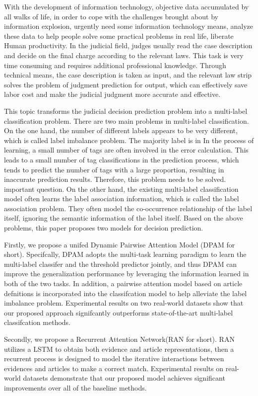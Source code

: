 \begin{eabstract}
With the development of information technology, objective data accumulated by all walks of life, in order to cope with the challenges brought about by information explosion, urgently need some information technology means, analyze these data to help people solve some practical problems in real life, liberate Human productivity. In the judicial field, judges usually read the case description and decide on the final charge according to the relevant laws. This task is very time consuming and requires additional professional knowledge. Through technical means, the case description is taken as input, and the relevant law strip solves the problem of judgment prediction for output, which can effectively save labor cost and make the judicial judgment more accurate and effective.

This topic transforms the judicial decision prediction problem into a multi-label classification problem. There are two main problems in multi-label classification. On the one hand, the number of different labels appears to be very different, which is called label imbalance problem. The majority label is in In the process of learning, a small number of tags are often involved in the error calculation. This leads to a small number of tag classifications in the prediction process, which tends to predict the number of tags with a large proportion, resulting in inaccurate prediction results. Therefore, this problem needs to be solved. important question. On the other hand, the existing multi-label classification model often learns the label association information, which is called the label association problem. They often model the co-occurrence relationship of the label itself, ignoring the semantic information of the label itself. Based on the above problems, this paper proposes two models for decision prediction.

Firstly, we propose a unifed Dynamic Pairwise Attention Model (DPAM for short). Specifcally, DPAM adopts the multi-task learning paradigm to learn the multi-label classifer and the threshold predictor jointly, and thus DPAM can improve the generalization performance by leveraging the information learned in both of the two tasks. In addition, a pairwise attention model based on article defnitions is incorporated into the classifcation model to help alleviate the label imbalance problem. Experimental results on two real-world datasets show that our proposed approach signifcantly outperforms state-of-the-art multi-label classifcation methods.

Secondly, we propose a Recurrent Attention Network(RAN for short). RAN utilizes a LSTM to obtain both evidence and article representations, then a recurrent process is designed to model the iterative interactions between evidences and articles to make a correct match. Experimental results on real-world datasets demonstrate that our proposed model achieves significant improvements over all of the baseline methods.

\end{eabstract}